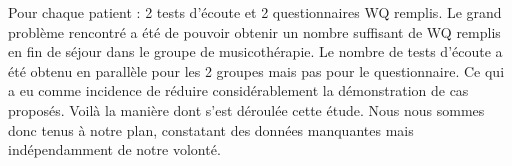  Pour chaque patient : 2 tests d'écoute et 2 
questionnaires WQ 
remplis.
Le grand problème rencontré a été de pouvoir obtenir un nombre suffisant  de WQ remplis en fin de 
séjour dans le groupe de musicothérapie.
Le nombre de tests d'écoute a été obtenu en parallèle pour les 2 groupes mais pas pour le questionnaire.
Ce qui a eu comme incidence de réduire considérablement la démonstration de cas proposés.
Voilà la manière dont s'est déroulée cette étude.
Nous nous sommes donc tenus à notre plan, constatant des données  manquantes mais 
indépendamment de notre volonté.
